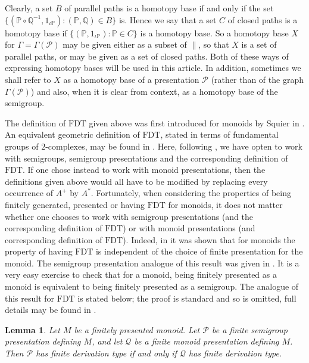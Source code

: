 \documentclass[11pt]{amsart}
\newtheorem{lem}{Lemma}
\theoremstyle{plain}
\begin{document}
Clearly, a set $B$ of parallel paths is a homotopy base if and only if the set $\{({\mathbb{P}} \circ {\mathbb{Q}}^{-1}, 1_{\iota {\mathbb{P}}}) : ({\mathbb{P}}, {\mathbb{Q}}) \in B  \}$ is. Hence we say that a set $C$ of closed paths is a homotopy base if $\{ ({\mathbb{P}}, 1_{\iota {\mathbb{P}}}) : {\mathbb{P}} \in C\}$ is a homotopy base. So a homotopy base $X$ for $\Gamma = \Gamma(\mathcal{P})$ may be given either as a subset of $\parallel$, so that $X$ is a set of parallel paths, or may be given as a set of closed paths. Both of these ways of expressing homotopy bases will be used in this article. In addition, sometimes we shall refer to $X$ as a homotopy base of a presentation $\mathcal{P}$ (rather than of the graph $\Gamma(\mathcal{P})$) and also, when it is clear from context, as a homotopy base of the semigroup.    

The definition of $\mathrm{FDT}$ given above was first introduced for monoids by Squier in \cite{Squier1}. An equivalent geometric definition of $\mathrm{FDT}$, stated in terms of fundamental groups of $2$-complexes, may be found in \cite{Pride2}. Here, following \cite{Malheiro1}, we have opten to work with semigroups, semigroup presentations and the corresponding definition of $\mathrm{FDT}$. If one chose instead to work with monoid presentations, then the definitions given above would all have to be modified by replacing every occurrence of $A^+$ by $A^*$. Fortunately, when considering the properties of being finitely generated, presented or having $\mathrm{FDT}$ for monoids, it does not matter whether one chooses to work with semigroup presentations (and the corresponding definition of $\mathrm{FDT}$) or with monoid presentations (and corresponding definition of $\mathrm{FDT}$).   
Indeed, in \cite[Theorem~4.3]{Squier1} it was shown that for monoids the property of having $\mathrm{FDT}$ is independent of the choice of finite presentation for the monoid. The semigroup presentation analogue of this result was given in \cite[Theorem~3]{Malheiro1}. It is a very easy exercise to check that for a monoid, being finitely presented as a monoid is equivalent to being finitely presented as a semigroup. The analogue of this result for $\mathrm{FDT}$ is stated below; the proof is standard and so is omitted, full details may be found in \cite[Section~2.4]{MalheiroThesis}.

\begin{lem}
Let $M$ be a finitely presented monoid. Let $\mathcal{P}$ be a finite semigroup presentation defining $M$, and let $\mathcal{Q}$ be a finite monoid presentation defining $M$. Then $\mathcal{P}$ has finite derivation type if and only if $\mathcal{Q}$ has finite derivation type.
\end{lem}
\end{document}
